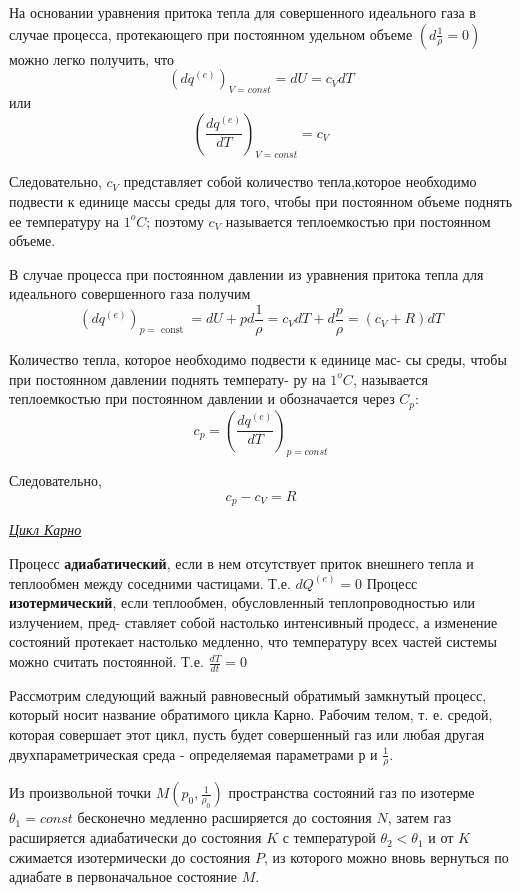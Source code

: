 На основании уравнения притока тепла для совершенного идеального газа в случае процесса, протекающего при постоянном удельном объеме $\left(\displaystyle d\frac{1}{\rho}=0\right)$ можно легко получить, что
$$ (dq^{(e)})_{V = const} = dU = c_VdT $$
или
$$ \left( \frac{dq^{(e)}}{dT} \right)_{V=const} = c_V $$

Следовательно,  $c_V$ представляет собой количество тепла,которое необходимо подвести к единице массы среды для того, чтобы при постоянном объеме поднять ее температуру на $1^oC$;  поэтому $c_V$ называется теплоемкостью при постоянном объеме.

В случае процесса при постоянном давлении из уравнения притока тепла для идеального совершенного газа получим
$$ \left(d q^{(e)}\right)_{p=\text { const }}=d U+p d \frac{1}{\rho}=c_V d T+d \frac{p}{\rho}=\left(c_V+R\right) d T $$

Количество тепла, которое необходимо подвести к единице мас- сы среды, чтобы при постоянном давлении поднять температу- ру на $1^oC$, называется теплоемкостью при постоянном давлении и обозначается через $C_p$:
$$ c_p = \left( \frac{dq^{(e)}}{dT} \right)_{p=const} $$

Следовательно, $$ c_p - c_V = R $$


\begin{center}
	\textit{\underline{Цикл Карно}}
\end{center}

Процесс \textbf{адиабатический}, если в нем отсутствует приток внешнего тепла и теплообмен между соседними частицами. Т.е. $\displaystyle dQ^{(e)} = 0$
Процесс \textbf{изотермический}, если теплообмен, обусловленный теплопроводностью или излучением, пред- ставляет собой настолько интенсивный продесс, а изменение состояний протекает настолько медленно, что температуру всех частей системы можно считать постоянной. Т.е. $\displaystyle \frac{dT}{dt} = 0$

Рассмотрим следующий важный равновесный обратимый замкнутый процесс, который носит название обратимого цикла Карно. Рабочим телом, т. е. средой, которая совершает этот цикл, пусть будет совершенный газ или любая другая двухпараметрическая среда - определяемая параметрами р и $\frac{1}{\rho}$. 

Из произвольной точки $M (p_0, \frac{1}{\rho_0})$ пространства состояний газ по изотерме $\theta_1 = const$ бесконечно медленно расширяется до состояния $N$, затем газ расширяется адиабатически до состояния $K$ с  температурой $\theta_2 < \theta_1$ и от $K$ сжимается изотермически до состояния $P$, из которого можно вновь вернуться по адиабате в первоначальное состояние $M$.

